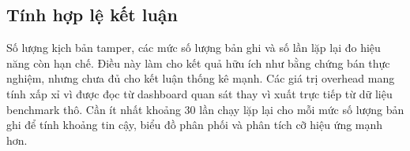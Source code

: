 \subsection{Tính hợp lệ kết
luận}\label{sec:validityketluan}

Số lượng kịch bản tamper, các mức số lượng bản ghi và số lần lặp lại đo
hiệu năng còn hạn chế. Điều này làm cho kết quả hữu ích như bằng chứng
bán thực nghiệm, nhưng chưa đủ cho kết luận thống kê mạnh. Các giá trị
overhead mang tính xấp xỉ vì được đọc từ dashboard quan sát thay vì xuất
trực tiếp từ dữ liệu benchmark thô. Cần ít nhất khoảng 30 lần chạy lặp
lại cho mỗi mức số lượng bản ghi để tính khoảng tin cậy, biểu đồ phân
phối và phân tích cỡ hiệu ứng mạnh hơn.
